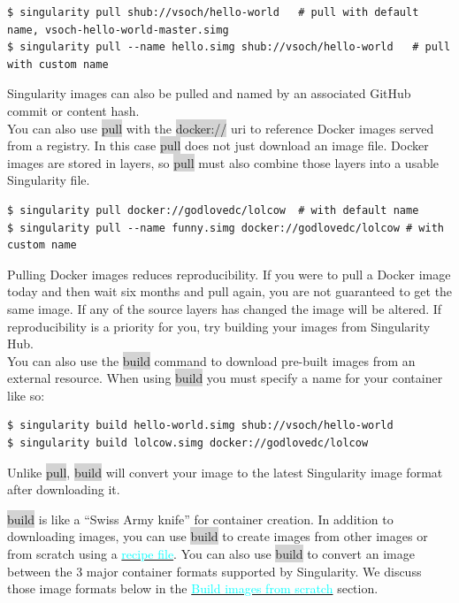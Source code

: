 \documentclass[a4paper]{article}
\begin{document}
\begin{lstlisting}[frame=single]  
$ singularity pull shub://vsoch/hello-world   # pull with default name, vsoch-hello-world-master.simg
$ singularity pull --name hello.simg shub://vsoch/hello-world   # pull with custom name
\end{lstlisting}

Singularity images can also be pulled and named by an associated GitHub commit or content hash.\\
You can also use \colorbox{lightgray}{pull} with the \colorbox{lightgray}{docker://} uri to reference Docker images served from a registry. In this case \colorbox{lightgray}{pull} does not just download an image file. Docker images are stored in layers, so \colorbox{lightgray}{pull} must also combine those layers into a usable Singularity file.

\begin{lstlisting}[frame=single]  
$ singularity pull docker://godlovedc/lolcow  # with default name
$ singularity pull --name funny.simg docker://godlovedc/lolcow # with custom name
\end{lstlisting}

Pulling Docker images reduces reproducibility. If you were to pull a Docker image today and then wait six months and pull again, you are not guaranteed to get the same image. If any of the source layers has changed the image will be altered. If reproducibility is a priority for you, try building your images from Singularity Hub.\\

You can also use the \colorbox{lightgray}{build} command to download pre-built images from an external resource. When using \colorbox{lightgray}{build} you must specify a name for your container like so:

\begin{lstlisting}[frame=single]  
$ singularity build hello-world.simg shub://vsoch/hello-world
$ singularity build lolcow.simg docker://godlovedc/lolcow
\end{lstlisting}

Unlike \colorbox{lightgray}{pull}, \colorbox{lightgray}{build} will convert your image to the latest Singularity image format after downloading it.

\colorbox{lightgray}{build} is like a “Swiss Army knife” for container creation. In addition to downloading images, you can use \colorbox{lightgray}{build} to create images from other images or from scratch using a  \hyperref[sec:recipefile]{{\textcolor{cyan}{recipe file}}}. You can also use \colorbox{lightgray}{build} to convert an image between the 3 major container formats supported by Singularity. We discuss those image formats below in the \hyperref[sec:buildimagesfromscratch]{{\textcolor{cyan}{Build images from scratch}}} section.
\end{document}
